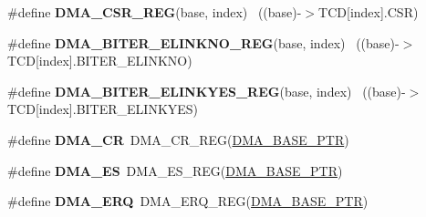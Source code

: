 \begin{DoxyCompactItemize}
\item 
\hypertarget{group___d_m_a___register___accessor___macros_gaeae560383449240027988bb9a841a4d6}{}\#define {\bfseries D\+M\+A\+\_\+\+C\+S\+R\+\_\+\+R\+E\+G}(base,  index)                                ~((base)-\/$>$T\+C\+D\mbox{[}index\mbox{]}.C\+S\+R)\label{group___d_m_a___register___accessor___macros_gaeae560383449240027988bb9a841a4d6}

\item 
\hypertarget{group___d_m_a___register___accessor___macros_ga6ea550dcc97491ba870ee3c9ceadc626}{}\#define {\bfseries D\+M\+A\+\_\+\+B\+I\+T\+E\+R\+\_\+\+E\+L\+I\+N\+K\+N\+O\+\_\+\+R\+E\+G}(base,  index)            ~((base)-\/$>$T\+C\+D\mbox{[}index\mbox{]}.B\+I\+T\+E\+R\+\_\+\+E\+L\+I\+N\+K\+N\+O)\label{group___d_m_a___register___accessor___macros_ga6ea550dcc97491ba870ee3c9ceadc626}

\item 
\hypertarget{group___d_m_a___register___accessor___macros_gabd9cdae95c739d0108313528a176d89e}{}\#define {\bfseries D\+M\+A\+\_\+\+B\+I\+T\+E\+R\+\_\+\+E\+L\+I\+N\+K\+Y\+E\+S\+\_\+\+R\+E\+G}(base,  index)          ~((base)-\/$>$T\+C\+D\mbox{[}index\mbox{]}.B\+I\+T\+E\+R\+\_\+\+E\+L\+I\+N\+K\+Y\+E\+S)\label{group___d_m_a___register___accessor___macros_gabd9cdae95c739d0108313528a176d89e}

\item 
\hypertarget{group___d_m_a___register___accessor___macros_gacfc38bcb982272f5eaf2b00932f9a68e}{}\#define {\bfseries D\+M\+A\+\_\+\+C\+R}~D\+M\+A\+\_\+\+C\+R\+\_\+\+R\+E\+G(\hyperlink{group___d_m_a___peripheral_ga6997fbc1b1973e9f27170217a3bd6f22}{D\+M\+A\+\_\+\+B\+A\+S\+E\+\_\+\+P\+T\+R})\label{group___d_m_a___register___accessor___macros_gacfc38bcb982272f5eaf2b00932f9a68e}

\item 
\hypertarget{group___d_m_a___register___accessor___macros_ga20c45f5cf45e7046a88e8d2d8d495bd1}{}\#define {\bfseries D\+M\+A\+\_\+\+E\+S}~D\+M\+A\+\_\+\+E\+S\+\_\+\+R\+E\+G(\hyperlink{group___d_m_a___peripheral_ga6997fbc1b1973e9f27170217a3bd6f22}{D\+M\+A\+\_\+\+B\+A\+S\+E\+\_\+\+P\+T\+R})\label{group___d_m_a___register___accessor___macros_ga20c45f5cf45e7046a88e8d2d8d495bd1}

\item 
\hypertarget{group___d_m_a___register___accessor___macros_gabcd6dd657e5b4c8454d1b5caa49a99d6}{}\#define {\bfseries D\+M\+A\+\_\+\+E\+R\+Q}~D\+M\+A\+\_\+\+E\+R\+Q\+\_\+\+R\+E\+G(\hyperlink{group___d_m_a___peripheral_ga6997fbc1b1973e9f27170217a3bd6f22}{D\+M\+A\+\_\+\+B\+A\+S\+E\+\_\+\+P\+T\+R})\label{group___d_m_a___register___accessor___macros_gabcd6dd657e5b4c8454d1b5caa49a99d6}


\end{DoxyCompactItemize}

